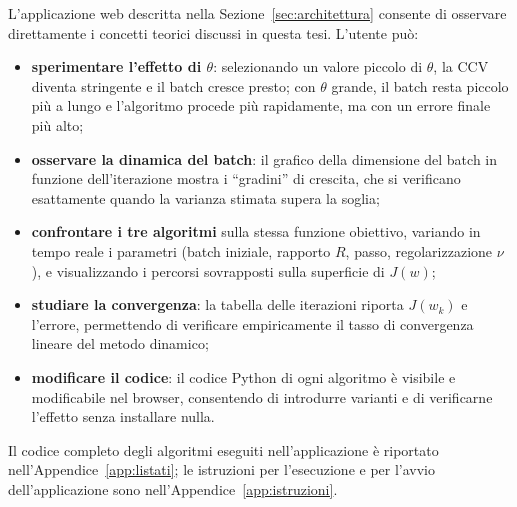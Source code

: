 L'applicazione web descritta nella Sezione~\ref{sec:architettura} consente
di osservare direttamente i concetti teorici discussi in questa tesi.
L'utente può:

\begin{itemize}
  \item \textbf{sperimentare l'effetto di $\theta$}: selezionando un valore
  piccolo di $\theta$, la CCV diventa stringente e il batch cresce presto; con
  $\theta$ grande, il batch resta piccolo più a lungo e l'algoritmo procede
  più rapidamente, ma con un errore finale più alto;
  \item \textbf{osservare la dinamica del batch}: il grafico della dimensione
  del batch in funzione dell'iterazione mostra i ``gradini'' di crescita,
  che si verificano esattamente quando la varianza stimata supera la soglia;
  \item \textbf{confrontare i tre algoritmi} sulla stessa funzione obiettivo,
  variando in tempo reale i parametri (batch iniziale, rapporto $R$, passo,
  regolarizzazione $\nu$), e visualizzando i percorsi sovrapposti sulla
  superficie di $J(w)$;
  \item \textbf{studiare la convergenza}: la tabella delle iterazioni riporta
  $J(w_k)$ e l'errore, permettendo di verificare empiricamente il tasso di
  convergenza lineare del metodo dinamico;
  \item \textbf{modificare il codice}: il codice Python di ogni algoritmo è
  visibile e modificabile nel browser, consentendo di introdurre varianti e di
  verificarne l'effetto senza installare nulla.
\end{itemize}

Il codice completo degli algoritmi eseguiti nell'applicazione è riportato
nell'Appendice~\ref{app:listati}; le istruzioni per l'esecuzione e per
l'avvio dell'applicazione sono nell'Appendice~\ref{app:istruzioni}.

